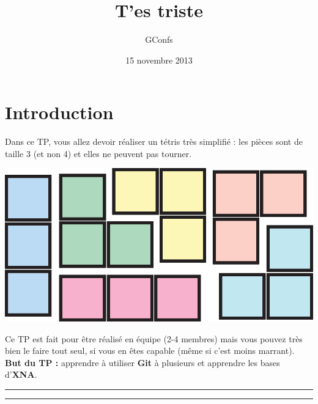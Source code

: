 \documentclass[a4paper]{article}
\title{T'es triste}
\author{
    GConfs
}
\date{15 novembre 2013}
\begin{document}
\color{foreground}

%
\begin{center}
\end{center}

\section*{Introduction}

Dans ce TP, vous allez devoir réaliser un tétris très simplifié : les pièces
sont de taille 3 (et non 4) et elles ne peuvent pas tourner. \\

\begin{center}
    \includegraphics[scale=0.5]{img/pieces.eps}
\end{center}

Ce TP est fait pour être réalisé en équipe (2-4 membres) mais vous pouvez très
bien le faire tout seul, si vous en êtes capable (même si c'est moins marrant).
\\

\textbf{But du TP :} apprendre à utiliser \textbf{Git} à plusieurs et apprendre
les bases d'\textbf{XNA}.

\begin{center}\noindent\rule{12cm}{0.4pt}\end{center}

\tableofcontents

\begin{center}\noindent\rule{12cm}{0.4pt}\end{center}
\end{document}
